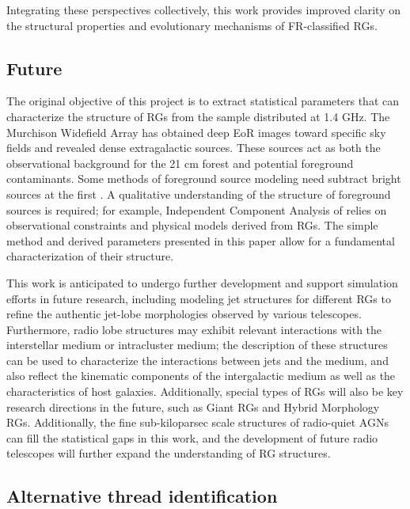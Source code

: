 \documentclass{aa}
\begin{document}
Integrating these perspectives collectively, this work provides improved clarity on the structural properties and evolutionary mechanisms of FR-classified RGs.




\subsection{Future}\label{sec:Future}

The original objective of this project is to extract statistical parameters that can characterize the structure of RGs from the sample distributed at 1.4 GHz. 
The Murchison Widefield Array has obtained deep EoR images toward specific sky fields \citep{offringa_parametrizing_2016} and revealed dense extragalactic sources. These sources act as both the observational background for the 21 cm forest and potential foreground contaminants.
Some methods of foreground source modeling need subtract bright sources at the first \citep{di_matteo_radio_2002,di_matteo_21-cm_2004}.  
A qualitative understanding of the structure of foreground sources is required; for example, Independent Component Analysis of \cite{chapman_foreground_2012} relies on observational constraints and physical models derived from RGs. The simple method and derived parameters presented in this paper allow for a fundamental characterization of their structure.

This work is anticipated to undergo further development and support simulation efforts in future research, including modeling jet structures for different RGs to refine the authentic jet-lobe morphologies observed by various telescopes. Furthermore, radio lobe structures may exhibit relevant interactions with the interstellar medium or intracluster medium; the description of these structures can be used to characterize the interactions between jets and the medium, and also reflect the kinematic components of the intergalactic medium as well as the characteristics of host galaxies. Additionally, special types of RGs will also be key research directions in the future, such as Giant RGs and Hybrid Morphology RGs.
Additionally, the fine sub-kiloparsec scale structures of radio-quiet AGNs \citep[e.g., those detected in J0802+4643][]{vardoulaki_fr-type_2021} can fill the statistical gaps in this work, and the development of future radio telescopes will further expand the understanding of RG structures.






\begin{appendix}
\section{Alternative thread identification}\label{app:Alt} 




\end{appendix}
\end{document}
